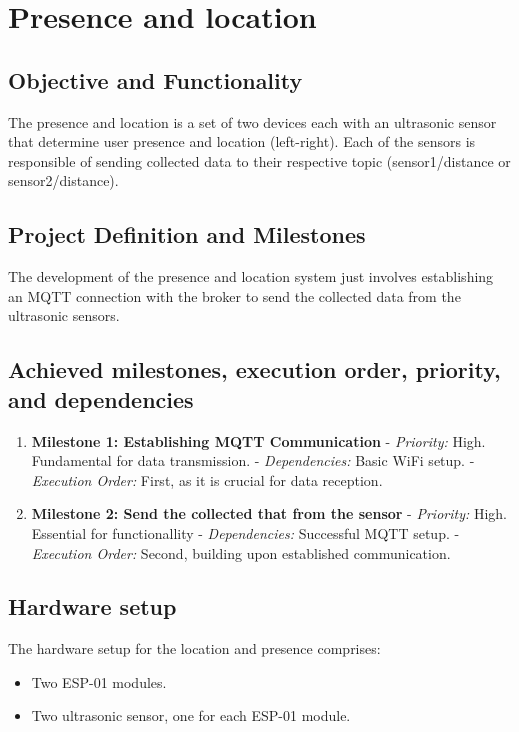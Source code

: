 \documentclass{article}
\begin{document}
\section{Presence and location}

\subsection{Objective and Functionality}
The presence and location is a set of two devices each with an ultrasonic sensor that determine user presence and location (left-right). Each of the sensors is responsible of sending collected data to their respective topic (sensor1/distance or sensor2/distance).

\subsection{Project Definition and Milestones}
The development of the presence and location system just involves establishing an MQTT connection with the broker to send the collected data from the ultrasonic sensors.

\subsection{Achieved milestones, execution order, priority, and dependencies}
\begin{enumerate}
    \item \textbf{Milestone 1: Establishing MQTT Communication}
       - \textit{Priority:} High. Fundamental for data transmission.
       - \textit{Dependencies:} Basic WiFi setup.
       - \textit{Execution Order:} First, as it is crucial for data reception.

    \item \textbf{Milestone 2: Send the collected that from the sensor}
       - \textit{Priority:} High. Essential for functionallity
       - \textit{Dependencies:} Successful MQTT setup.
       - \textit{Execution Order:} Second, building upon established communication.
\end{enumerate}

\subsection{Hardware setup}
The hardware setup for the location and presence comprises:
\begin{itemize}
    \item Two ESP-01 modules.
    \item Two ultrasonic sensor, one for each ESP-01 module.
\end{itemize}
\end{document}
